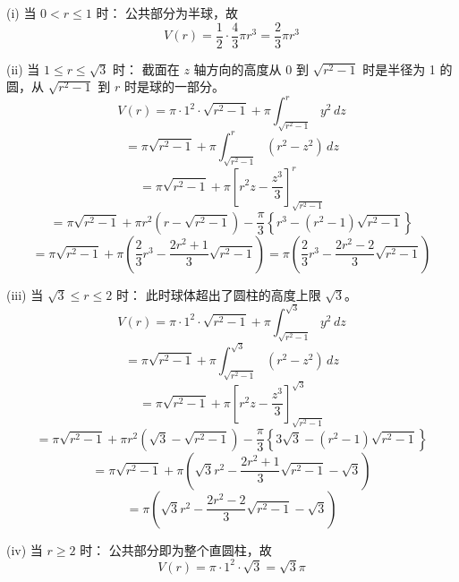 \begin{questions}
\begin{solution}
(i) 当 $0 < r \le 1$ 时：
公共部分为半球，故
\[
V(r) = \frac{1}{2} \cdot \frac{4}{3}\pi r^3 = \frac{2}{3}\pi r^3
\]

(ii) 当 $1 \le r \le \sqrt{3}$ 时：
截面在 $z$ 轴方向的高度从 0 到 $\sqrt{r^2 - 1}$ 时是半径为 1 的圆，从 $\sqrt{r^2 - 1}$ 到 $r$ 时是球的一部分。
\[
V(r) = \pi \cdot 1^2 \cdot \sqrt{r^2 - 1} + \pi \int_{\sqrt{r^2 - 1}}^{r} y^2 \,dz
\]
\[
= \pi \sqrt{r^2 - 1} + \pi \int_{\sqrt{r^2 - 1}}^{r} \left( r^2 - z^2 \right) \,dz
\]
\[
= \pi \sqrt{r^2 - 1} + \pi \left[ r^2 z - \frac{z^3}{3} \right]_{\sqrt{r^2 - 1}}^{r}
\]
\[
= \pi \sqrt{r^2 - 1} + \pi r^2 \left( r - \sqrt{r^2 - 1} \right) - \frac{\pi}{3} \left\{ r^3 - \left( r^2 - 1 \right) \sqrt{r^2 - 1} \right\}
\]
\[
= \pi \sqrt{r^2 - 1} + \pi \left( \frac{2}{3}r^3 - \frac{2r^2 + 1}{3} \sqrt{r^2 - 1} \right) = \pi \left( \frac{2}{3}r^3 - \frac{2r^2 - 2}{3} \sqrt{r^2 - 1} \right)
\]

(iii) 当 $\sqrt{3} \le r \le 2$ 时：
此时球体超出了圆柱的高度上限 $\sqrt{3}$。
\[
V(r) = \pi \cdot 1^2 \cdot \sqrt{r^2 - 1} + \pi \int_{\sqrt{r^2 - 1}}^{\sqrt{3}} y^2 \,dz
\]
\[
= \pi \sqrt{r^2 - 1} + \pi \int_{\sqrt{r^2 - 1}}^{\sqrt{3}} \left( r^2 - z^2 \right) \,dz
\]
\[
= \pi \sqrt{r^2 - 1} + \pi \left[ r^2 z - \frac{z^3}{3} \right]_{\sqrt{r^2 - 1}}^{\sqrt{3}}
\]
\[
= \pi \sqrt{r^2 - 1} + \pi r^2 \left( \sqrt{3} - \sqrt{r^2 - 1} \right) - \frac{\pi}{3} \left\{ 3\sqrt{3} - \left( r^2 - 1 \right) \sqrt{r^2 - 1} \right\}
\]
\[
= \pi \sqrt{r^2 - 1} + \pi \left( \sqrt{3}r^2 - \frac{2r^2 + 1}{3} \sqrt{r^2 - 1} - \sqrt{3} \right)
\]
\[
= \pi \left( \sqrt{3}r^2 - \frac{2r^2 - 2}{3} \sqrt{r^2 - 1} - \sqrt{3} \right)
\]

(iv) 当 $r \ge 2$ 时：
公共部分即为整个直圆柱，故
\[
V(r) = \pi \cdot 1^2 \cdot \sqrt{3} = \sqrt{3}\pi
\]
\end{solution}


\end{questions}

